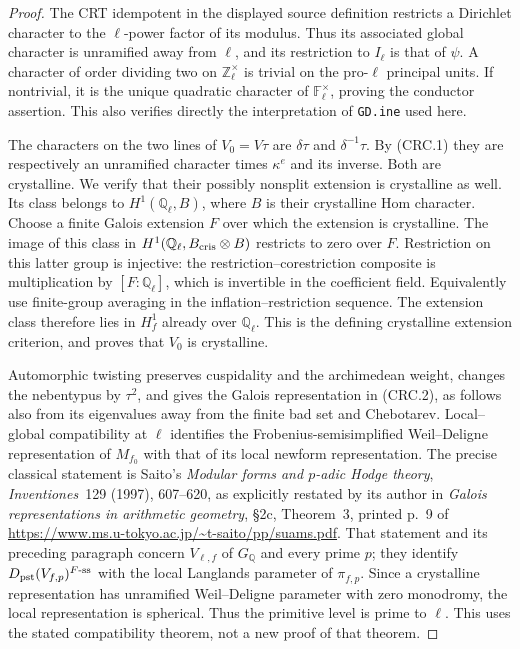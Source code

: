 \begin{proof}
The CRT idempotent in the displayed source definition
restricts a Dirichlet character to the $\ell$-power factor
of its modulus.  Thus its associated global character is
unramified away from $\ell$, and its restriction to
$I_\ell$ is that of $\psi$.  A character of order dividing
two on $\mathbb Z_\ell^\times$ is trivial on the pro-$\ell$
principal units.  If nontrivial, it is the unique quadratic
character of $\mathbb F_\ell^\times$, proving the conductor
assertion.  This also verifies directly the interpretation
of \texttt{GD.ine} used here.

The characters on the two lines of $V_0=V\tau$ are
$\delta\tau$ and $\delta^{-1}\tau$.  By (CRC.1) they
are respectively an unramified character times
$\kappa^e$ and its inverse.  Both are crystalline.
We verify that their possibly nonsplit extension is
crystalline as well.  Its class belongs to
$H^1(\mathbb Q_\ell,B)$, where $B$ is their crystalline
Hom character.  Choose a finite Galois extension $F$ over
which the extension is crystalline.  The image of this
class in $H^1(\mathbb Q_\ell,B_{\rm cris}\otimes B)$
restricts to zero over $F$.
Restriction on this latter group is injective: the
restriction--corestriction composite is multiplication
by $[F:\mathbb Q_\ell]$, which is invertible in the
coefficient field.  Equivalently use finite-group averaging
in the inflation--restriction sequence.
The extension class therefore lies in $H^1_f$ already
over $\mathbb Q_\ell$.  This is the defining crystalline
extension criterion, and proves that $V_0$ is crystalline.

Automorphic twisting preserves cuspidality and the
archimedean weight, changes the nebentypus by $\tau^2$,
and gives the Galois representation in (CRC.2), as follows
also from its eigenvalues away from the finite bad set
and Chebotarev.  Local--global compatibility at $\ell$
identifies the Frobenius-semisimplified Weil--Deligne
representation of $M_{f_0}$ with that of its local
newform representation.  The precise classical statement is Saito's
\emph{Modular forms and $p$-adic Hodge theory},
\emph{Inventiones}~129 (1997), 607--620, as explicitly
restated by its author in
\emph{Galois representations in arithmetic geometry},
\S2c, Theorem~3, printed p.~9 of
\url{https://www.ms.u-tokyo.ac.jp/~t-saito/pp/suams.pdf}.
That statement and its preceding paragraph concern
$V_{\ell,f}$ of $G_{\mathbb Q}$ and every prime $p$;
they identify $D_{\rm pst}(V_{f,p})^{F\text{-}\rm ss}$
with the local Langlands parameter of $\pi_{f,p}$.
Since a crystalline
representation has unramified Weil--Deligne parameter
with zero monodromy, the local representation is
spherical.  Thus the primitive level is prime to $\ell$.
This uses the stated compatibility theorem, not a new
proof of that theorem.


\end{proof}

